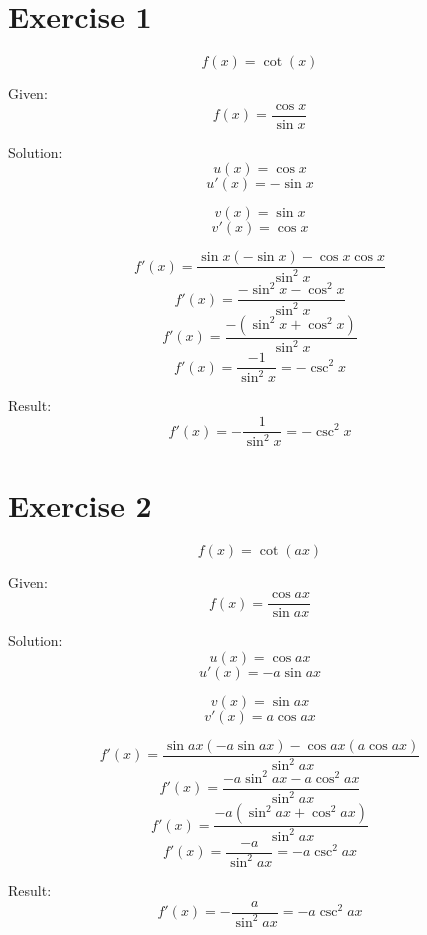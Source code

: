 \documentclass[a4paper, 10pt]{scrartcl}
\begin{document}
\section{Exercise 1}
\[f(x) = \cot(x)\]

Given:
\[f(x) = \frac{\cos{x}}{\sin{x}}\]

Solution:
\[u(x) = \cos{x}\]
\[u'(x) = -\sin{x}\]

\[v(x) = \sin{x}\]
\[v'(x) = \cos{x}\]

\[f'(x) = \frac{\sin{x}(-\sin{x}) - \cos{x}\cos{x}}{\sin^{2}{x}}\]
\[f'(x) = \frac{-\sin^{2}{x} - \cos^{2}{x}}{\sin^{2}{x}}\]
\[f'(x) = \frac{-(\sin^{2}{x} + \cos^{2}{x})}{\sin^{2}{x}}\]
\[f'(x) = \frac{-1}{\sin^{2}{x}} = -\csc^{2}{x}\]

Result:
\[f'(x) = -\frac{1}{\sin^{2}{x}} = -\csc^{2}{x}\]

\section{Exercise 2}
\[f(x) = \cot(ax)\]

Given:
\[f(x) = \frac{\cos{ax}}{\sin{ax}}\]

Solution:
\[u(x) = \cos{ax}\]
\[u'(x) = -a\sin{ax}\]

\[v(x) = \sin{ax}\]
\[v'(x) = a\cos{ax}\]

\[f'(x) = \frac{\sin{ax}(-a\sin{ax}) - \cos{ax}(a\cos{ax})}{\sin^{2}{ax}}\]
\[f'(x) = \frac{-a\sin^{2}{ax} - a\cos^{2}{ax}}{\sin^{2}{ax}}\]
\[f'(x) = \frac{-a(\sin^{2}{ax} + \cos^{2}{ax})}{\sin^{2}{ax}}\]
\[f'(x) = \frac{-a}{\sin^{2}{ax}} = -a\csc^{2}{ax}\]

Result:
\[f'(x) = -\frac{a}{\sin^{2}{ax}} = -a\csc^{2}{ax}\]
\end{document}
